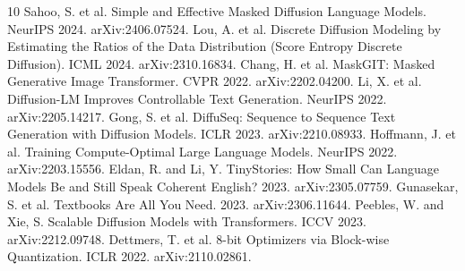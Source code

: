 \documentclass[11pt]{article}
\begin{document}
\begin{thebibliography}{10}\small
{} Sahoo, S. et al. Simple and Effective Masked Diffusion Language Models. NeurIPS 2024. arXiv:2406.07524.
 Lou, A. et al. Discrete Diffusion Modeling by Estimating the Ratios of the Data Distribution (Score Entropy Discrete Diffusion). ICML 2024. arXiv:2310.16834.
 Chang, H. et al. MaskGIT: Masked Generative Image Transformer. CVPR 2022. arXiv:2202.04200.
 Li, X. et al. Diffusion-LM Improves Controllable Text Generation. NeurIPS 2022. arXiv:2205.14217.
 Gong, S. et al. DiffuSeq: Sequence to Sequence Text Generation with Diffusion Models. ICLR 2023. arXiv:2210.08933.
 Hoffmann, J. et al. Training Compute-Optimal Large Language Models. NeurIPS 2022. arXiv:2203.15556.
 Eldan, R. and Li, Y. TinyStories: How Small Can Language Models Be and Still Speak Coherent English? 2023. arXiv:2305.07759.
 Gunasekar, S. et al. Textbooks Are All You Need. 2023. arXiv:2306.11644.
 Peebles, W. and Xie, S. Scalable Diffusion Models with Transformers. ICCV 2023. arXiv:2212.09748.
 Dettmers, T. et al. 8-bit Optimizers via Block-wise Quantization. ICLR 2022. arXiv:2110.02861.
\end{thebibliography}
\end{document}
